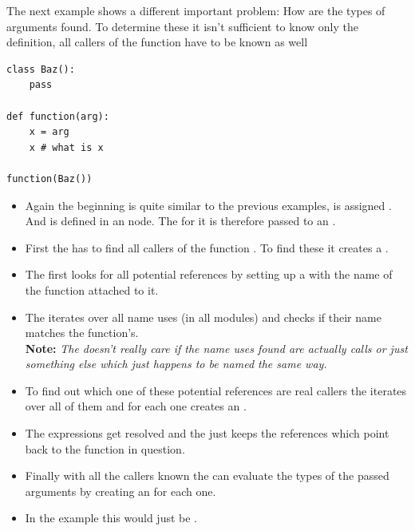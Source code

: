 \documentclass[12pt,halfparskip,DIV11,BCOR10mm]{scrreprt}
\begin{document}
The next example shows a different important problem: How are the types of arguments found. To determine these it isn't sufficient to know only the definition, all callers of the function have to be known as well

\begin{lstlisting}
class Baz():
    pass

def function(arg):
    x = arg
    x # what is x
    
function(Baz())
\end{lstlisting}

\begin{itemize}
    \item Again the beginning is quite similar to the previous examples,  is assigned . And  is defined in an  node. The  for it is therefore passed to an .
    \item First the  has to find all callers of the function . To find these it creates a .
    \item The  first looks for all potential references by setting up a  with the name of the function attached to it.
    \item The  iterates over all name uses (in all modules) and checks if their name matches the function's. \textbf{} \\\textbf{Note:} \emph{The  doesn't really care if the name uses found are actually calls or just something else which just happens to be named the same way.}
    \item To find out which one of these potential references are real callers the  iterates over all of them and for each one creates an .
    \item The expressions get resolved and the  just keeps the references which point back to the function in question.
    \item Finally with all the callers known the  can evaluate the types of the passed arguments by creating an  for each one.
    \item[] In the example this would just be .
\end{itemize}
\end{document}
